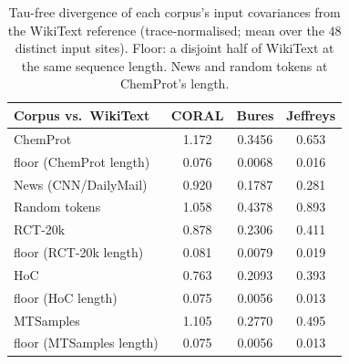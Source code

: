 \begin{table}[h]
\centering
\caption{Tau-free divergence of each corpus's input covariances from the WikiText reference (trace-normalised; mean over the $48$ distinct input sites). Floor: a disjoint half of WikiText at the same sequence length. News and random tokens at ChemProt's length.}
\label{tab:div}
\footnotesize
\setlength{\tabcolsep}{3pt}
\begin{tabular}{lccc}
\toprule
Corpus vs.\ WikiText & CORAL & Bures & Jeffreys \\
\midrule
ChemProt & 1.172 & 0.3456 & 0.653 \\
\quad floor (ChemProt length) & 0.076 & 0.0068 & 0.016 \\
News (CNN/DailyMail) & 0.920 & 0.1787 & 0.281 \\
Random tokens & 1.058 & 0.4378 & 0.893 \\
RCT-20k & 0.878 & 0.2306 & 0.411 \\
\quad floor (RCT-20k length) & 0.081 & 0.0079 & 0.019 \\
HoC & 0.763 & 0.2093 & 0.393 \\
\quad floor (HoC length) & 0.075 & 0.0056 & 0.013 \\
MTSamples & 1.105 & 0.2770 & 0.495 \\
\quad floor (MTSamples length) & 0.075 & 0.0056 & 0.013 \\
\bottomrule
\end{tabular}
\end{table}
